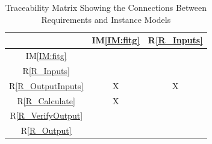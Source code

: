 \documentclass[12pt]{article}
\newcommand{\iref}[1]{IM\ref{#1}}
\newcommand{\rref}[1]{R\ref{#1}}
\begin{document}
\begin{table}[h!]
	\centering
	\begin{tabular}{|c|c|c|}
		\hline
		& \iref{IM:fitg}
		& \rref{R_Inputs} \\
		\hline
		\iref{IM:fitg}           & &  \\ \hline
		\rref{R_Inputs}           & &  \\ \hline
		\rref{R_OutputInputs}      & X & X \\ \hline
		\rref{R_Calculate}        & X &  \\ \hline
		\rref{R_VerifyOutput}    & &  \\ \hline
		\rref{R_Output}   & &   \\
		\hline
	\end{tabular}
	\caption{Traceability Matrix Showing the Connections Between Requirements 
	and Instance Models}
	\label{Table:R_trace}
\end{table}






\end{document}
